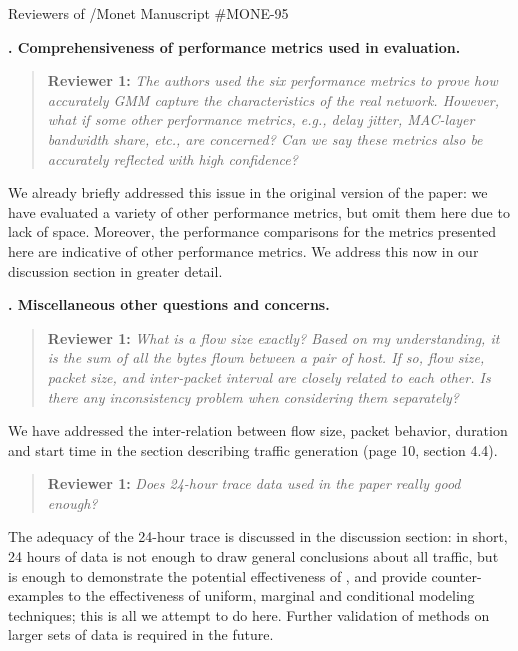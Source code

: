 \documentclass{letter}
\newcounter{topic}
\newcommand{\topic}[1]{
\addtocounter{topic}{1}
\textbf{\arabic{topic}. #1}
}
\newenvironment{reviewer}[1]%
{\begin{quote}\textbf{Reviewer #1:} \it}{\end{quote}}
\begin{document}
\begin{letter}{Reviewers of /Monet Manuscript \#MONE-95}
\topic{Comprehensiveness of performance metrics used in evaluation.}

\begin{reviewer}{1}
The authors used the six performance metrics to prove how accurately GMM capture the characteristics of the real network. However, what if some other performance metrics, e.g., delay jitter, MAC-layer bandwidth share, etc., are concerned? Can we say these metrics also be accurately reflected with high confidence?
\end{reviewer}

We already briefly addressed this issue in the original version of the paper:
we have evaluated a variety of other performance metrics, but omit them here due to lack of space.
Moreover, the performance comparisons for the metrics presented here are indicative of other performance metrics.
We address this now in our discussion section in greater detail.

\topic{Miscellaneous other questions and concerns.}

\begin{reviewer}{1}
What is a flow size exactly? Based on my understanding, it is the sum of all the bytes ﬂown between a pair of host. If so, flow size, packet size, and inter-packet interval are closely related to each other. Is there any inconsistency problem when considering them separately?
\end{reviewer}
We have addressed the inter-relation between flow size, packet behavior, duration and start time in the section describing traffic generation (page 10, section 4.4).

\begin{reviewer}{1}
Does 24-hour trace data used in the paper really good enough?
\end{reviewer}
The adequacy of the 24-hour trace is discussed in the discussion section: in short, 24 hours of data is not enough to draw general conclusions about all traffic, but is enough to demonstrate the potential effectiveness of , and provide counter-examples to the effectiveness of uniform, marginal and conditional modeling techniques;
this is all we attempt to do here.
Further validation of methods on larger sets of data is required in the future.


\end{letter}
\end{document}
